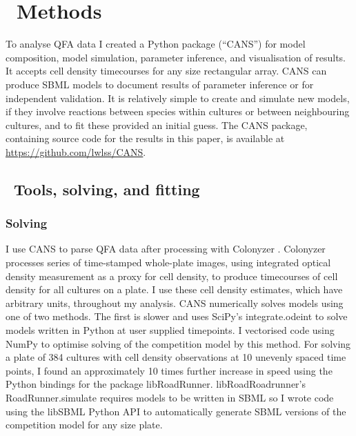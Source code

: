 \graphicspath{{images/}}

\section{\thesection~Methods}
\label{sec:methods}

To analyse QFA data I created a Python package (``CANS'') for model
composition, model simulation, parameter inference, and visualisation
of results. It accepts cell density timecourses for any size
rectangular array. CANS can produce SBML models to document results of
parameter inference or for independent validation. It is relatively
simple to create and simulate new models, if they involve reactions
between species within cultures or between neighbouring cultures, and
to fit these provided an initial guess. The CANS package, containing
source code for the results in this paper, is available at
\href{https://github.com/lwlss/CANS}{https://github.com/lwlss/CANS}.

\subsection{\thesubsection~Tools, solving, and fitting}

\subsubsection{Solving}


I use CANS to parse QFA data after processing with Colonyzer
\citep{Lawless2010}. Colonyzer processes series of time-stamped
whole-plate images, using integrated optical density measurement as a
proxy for cell density, to produce timecourses of cell density for all
cultures on a plate. I use these cell density estimates, which have
arbitrary units, throughout my analysis. CANS numerically solves
models using one of two methods. The first is slower and uses SciPy's
integrate.odeint to solve models written in Python at user supplied
timepoints. I vectorised code using NumPy to optimise solving of the
competition model by this method. For solving a plate of 384 cultures
with cell density observations at 10 unevenly spaced time points, I
found an approximately 10 times further increase in speed using the
Python bindings for the package libRoadRunner. libRoadRoadrunner's
RoadRunner.simulate requires models to be written in SBML so I wrote
code using the libSBML Python API to automatically generate SBML
versions of the competition model for any size plate.

